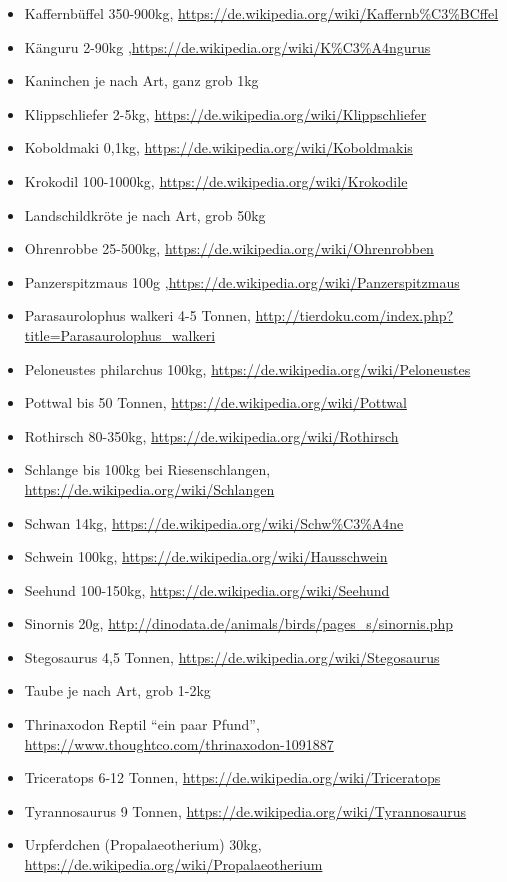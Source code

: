 \begin{itemize}
  \item Kaffernbüffel 350-900kg, \url{https://de.wikipedia.org/wiki/Kaffernb\%C3\%BCffel}
  \item Känguru 2-90kg ,\url{https://de.wikipedia.org/wiki/K\%C3\%A4ngurus}
  \item Kaninchen je nach Art, ganz grob 1kg
  \item Klippschliefer 2-5kg, \url{https://de.wikipedia.org/wiki/Klippschliefer}
  \item Koboldmaki 0,1kg, \url{https://de.wikipedia.org/wiki/Koboldmakis}
  \item Krokodil 100-1000kg, \url{https://de.wikipedia.org/wiki/Krokodile}
  \item Landschildkröte je nach Art, grob 50kg
  \item Ohrenrobbe 25-500kg, \url{https://de.wikipedia.org/wiki/Ohrenrobben}
  \item Panzerspitzmaus 100g ,\url{https://de.wikipedia.org/wiki/Panzerspitzmaus}
  \item Parasaurolophus walkeri 4-5 Tonnen, \url{http://tierdoku.com/index.php?title=Parasaurolophus_walkeri}
  \item Peloneustes philarchus 100kg, \url{https://de.wikipedia.org/wiki/Peloneustes}
  \item Pottwal bis 50 Tonnen, \url{https://de.wikipedia.org/wiki/Pottwal}
  \item Rothirsch 80-350kg, \url{https://de.wikipedia.org/wiki/Rothirsch}
  \item Schlange bis 100kg bei Riesenschlangen, \url{https://de.wikipedia.org/wiki/Schlangen}
  \item Schwan 14kg, \url{https://de.wikipedia.org/wiki/Schw\%C3\%A4ne}
  \item Schwein 100kg, \url{https://de.wikipedia.org/wiki/Hausschwein}
  \item Seehund 100-150kg, \url{https://de.wikipedia.org/wiki/Seehund}
  \item Sinornis 20g, \url{http://dinodata.de/animals/birds/pages_s/sinornis.php}
  \item Stegosaurus 4,5 Tonnen, \url{https://de.wikipedia.org/wiki/Stegosaurus}
  \item Taube je nach Art, grob 1-2kg
  \item Thrinaxodon Reptil "`ein paar Pfund"', \url{https://www.thoughtco.com/thrinaxodon-1091887}
  \item Triceratops 6-12 Tonnen, \url{https://de.wikipedia.org/wiki/Triceratops}
  \item Tyrannosaurus 9 Tonnen, \url{https://de.wikipedia.org/wiki/Tyrannosaurus}
  \item Urpferdchen (Propalaeotherium) 30kg, \url{https://de.wikipedia.org/wiki/Propalaeotherium}
 \end{itemize}
 

